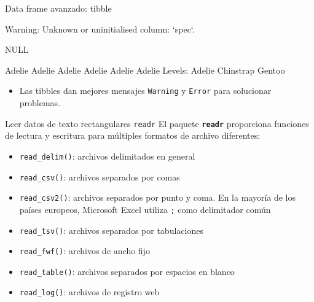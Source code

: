 \documentclass[
  ignorenonframetext,
  aspectratio=169]{beamer}
\newenvironment{Shaded}{\begin{snugshade}}{\end{snugshade}}
\newcommand{\FunctionTok}[1]{\textcolor[rgb]{0.00,0.00,0.00}{#1}}
\newcommand{\NormalTok}[1]{#1}
\newcommand{\SpecialCharTok}[1]{\textcolor[rgb]{0.00,0.00,0.00}{#1}}
\providecommand{\tightlist}{%
  \setlength{\itemsep}{0pt}\setlength{\parskip}{0pt}}
\let\oldverbatim\verbatim
\let\endoldverbatim\endverbatim
\renewenvironment{verbatim}{\tiny\oldverbatim}{\endoldverbatim}
\begin{document}
\begin{frame}[fragile]{Data frame avanzado: tibble}
\protect\hypertarget{data-frame-avanzado-tibble-10}{}
\begin{Shaded}
\end{Shaded}

\begin{verbatim}
Warning: Unknown or uninitialised column: `spec`.
\end{verbatim}

\begin{verbatim}
NULL
\end{verbatim}

\begin{Shaded}
\end{Shaded}

\begin{verbatim}
[1] Adelie Adelie Adelie Adelie Adelie Adelie
Levels: Adelie Chinstrap Gentoo
\end{verbatim}

\begin{itemize}
\tightlist
\item
  Las tibbles dan mejores mensajes \texttt{Warning} y \texttt{Error}
  para solucionar problemas.
\end{itemize}
\end{frame}

\begin{frame}[fragile]{Leer datos de texto rectangulares \texttt{readr}}
\protect\hypertarget{leer-datos-de-texto-rectangulares-readr}{}
El paquete \textbf{\texttt{readr}} proporciona funciones de lectura y
escritura para múltiples formatos de archivo diferentes:

\begin{itemize}
\item
  \texttt{read\_delim()}: archivos delimitados en general
\item
  \texttt{read\_csv()}: archivos separados por comas
\item
  \texttt{read\_csv2()}: archivos separados por punto y coma. En la
  mayoría de los países europeos, Microsoft Excel utiliza \texttt{;}
  como delimitador común
\item
  \texttt{read\_tsv()}: archivos separados por tabulaciones
\item
  \texttt{read\_fwf()}: archivos de ancho fijo
\item
  \texttt{read\_table()}: archivos separados por espacios en blanco
\item
  \texttt{read\_log()}: archivos de registro web
\end{itemize}
\end{frame}
\end{document}
